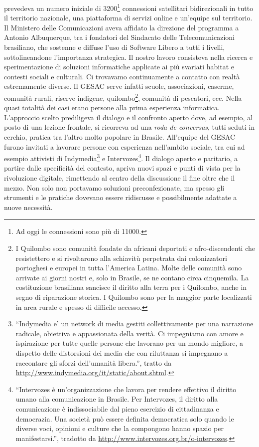 prevedeva un numero iniziale di 3200\footnote{Ad oggi le connessioni
  sono più di 11000.} connessioni satellitari bidirezionali in tutto
il territorio nazionale, una piattaforma di servizi online e un'equipe
sul territorio. Il Ministero delle Comunicazioni aveva affidato la
direzione del programma a Antonio Albuquerque, tra i fondatori del
Sindacato delle Telecomunicazioni brasiliano, che sostenne e diffuse
l'uso di Software Libero a tutti i livelli, sottolineandone
l'importanza strategica. Il nostro lavoro consisteva nella ricerca e
sperimentazione di soluzioni informatiche applicate ai più svariati
habitat e contesti sociali e culturali. Ci trovavamo continuamente a
contatto con realtà estremamente diverse. Il GESAC serve infatti
scuole, associazioni, caserme, comunità rurali, riserve indigene,
quilombo\footnote{I Quilombo sono comunità fondate da africani
  deportati e afro-discendenti che resistettero e si rivoltarono alla
  schiavitù perpetrata dai colonizzatori portoghesi e europei in tutta
  l'America Latina. Molte delle comunità sono arrivate ai giorni
  nostri e, solo in Brasile, se ne contano circa cinquemila. La
  costituzione brasiliana sancisce il diritto alla terra per i
  Quilombo, anche in segno di riparazione storica. I Quilombo sono per
  la maggior parte localizzati in area rurale e spesso di difficile
  accesso.}, comunità di pescatori, ecc. Nella quasi totalità dei casi
erano persone alla prima esperienza informatica. L'approccio scelto
prediligeva il dialogo e il confronto aperto dove, ad esempio, al
posto di una lezione frontale, si ricorreva ad una \emph{roda de
  conversas}, tutti seduti in cerchio, pratica tra l'altro molto
popolare in Brasile. All'equipe del GESAC furono invitati a lavorare
persone con esperienza nell'ambito sociale, tra cui ad esempio
attivisti di Indymedia\footnote{``Indymedia e' un network di media
  gestiti collettivamente per una narrazione radicale, obiettiva e
  appassionata della verità. Ci impegniamo con amore e ispirazione per
  tutte quelle persone che lavorano per un mondo migliore, a dispetto
  delle distorsioni dei media che con riluttanza si impegnano a
  raccontare gli sforzi dell'umanità libera.'', tratto da
  \url{http://www.indymedia.org/it/static/about.shtml}.} e
Intervozes\footnote{``Intervozes è un'organizzazione che lavora per
  rendere effettivo il diritto umano alla comunicazione in Brasile.
  Per Intervozes, il diritto alla comunicazione è indissociabile dal
  pieno esercizio di cittadinanza e democrazia. Una società può essere
  definita democratica solo quando le diverse voci, opinioni e culture
  che la compongono hanno spazio per manifestarsi.'', tradotto da
  \url{http://www.intervozes.org.br/o-intervozes}.}. Il dialogo aperto
e paritario, a partire dalle specificità del contesto, apriva nuovi
spazi e punti di vista per la rivoluzione digitale, rimettendo al
centro della discussione il fine oltre che il mezzo. Non solo non
portavamo soluzioni preconfezionate, ma spesso gli strumenti e le
pratiche dovevano essere ridiscusse e possibilmente adattate a nuove
necessità.

